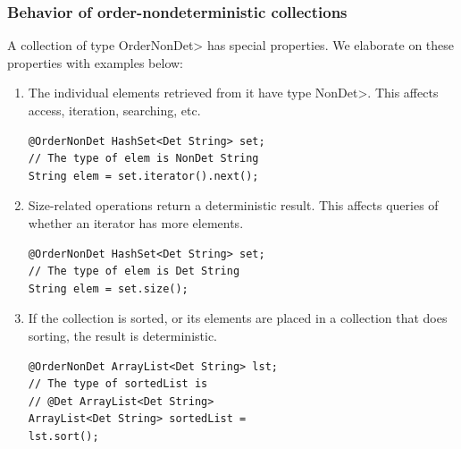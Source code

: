\subsubsection{Behavior of order-nondeterministic collections}\label{sec:ond-behavior}
A collection of type \<OrderNonDet> has special properties. We elaborate on these properties
with examples below:

\begin{enumerate}
    \item
    The individual elements retrieved from it have type \<NonDet>.  This
    affects access, iteration, searching, etc.
    \begin{verbatim}
@OrderNonDet HashSet<Det String> set; 
// The type of elem is NonDet String
String elem = set.iterator().next();
    \end{verbatim}
    \vspace{-0.4cm}
    \item
    Size-related operations return a deterministic result.  This affects
    queries of whether an iterator has more elements.
    \begin{verbatim}
@OrderNonDet HashSet<Det String> set; 
// The type of elem is Det String
String elem = set.size();
    \end{verbatim}
    \vspace{-0.4cm}
    \item
    If the collection is sorted, or its elements are placed in a collection
    that does sorting, the result is deterministic.
    \begin{verbatim}
@OrderNonDet ArrayList<Det String> lst; 
// The type of sortedList is 
// @Det ArrayList<Det String>
ArrayList<Det String> sortedList = 
lst.sort();
    \end{verbatim}
    \vspace{-0.4cm}
\end{enumerate}

